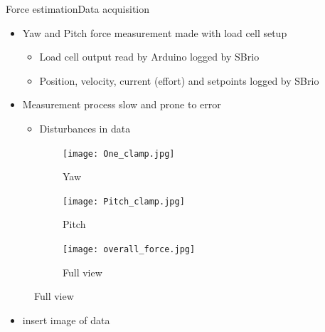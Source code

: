 \begin{frame}{Force estimation}{Data acquisition}
\begin{itemize}
\item Yaw and Pitch force measurement made with load cell setup
\begin{itemize}
\item Load cell output read by Arduino logged by SBrio
\item Position, velocity, current (effort) and setpoints logged by SBrio
\end{itemize}
\item Measurement process slow and prone to error
\begin{itemize}
\item Disturbances in data
\end{itemize}
\end{itemize}
\begin{figure}
\centering
    \begin{subfigure}[t]{0.32\textwidth}
        \centering
        \texttt{[image: One\_clamp.jpg]} 
        \caption{Yaw} \label{fig:mes1}
    \end{subfigure}
    \begin{subfigure}[t]{0.32\textwidth}
        \centering
        \texttt{[image: Pitch\_clamp.jpg]} 
        \caption{Pitch} \label{fig:mes2}
    \end{subfigure}
        \begin{subfigure}[t]{0.32\textwidth}
        \centering
        \texttt{[image: overall\_force.jpg]} 
        \caption{Full view} \label{fig:mes3}
    \end{subfigure}
\end{figure}
\end{frame}

\begin{frame}
\begin{itemize}
\item insert image of data
\end{itemize}
\end{frame}


